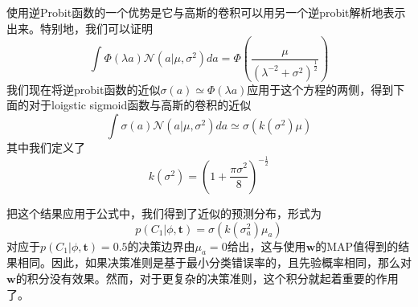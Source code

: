 使用逆Probit函数的一个优势是它与高斯的卷积可以用另一个逆probit解析地表示出来。特别地，我们可以证明 
\begin{equation}
	\int \Phi(\lambda a)\mathcal{N}(a|\mu,\sigma^2)da=\Phi\left(\frac{\mu}{(\lambda^{-2}+\sigma^2)^{\frac{1}{2}}} \right)
\end{equation}
我们现在将逆probit函数的近似$\sigma(a)\simeq \Phi(\lambda a)$应用于这个方程的两侧，得到下面的对于loigstic sigmoid函数与高斯的卷积的近似
\begin{equation}
	\int \sigma(a)\mathcal{N}(a|\mu,\sigma^2)da\simeq \sigma(k(\sigma^2)\mu)
\end{equation}
其中我们定义了
\begin{equation}
	k(\sigma^2)=(1+\frac{\pi\sigma^2}{8})^{-\frac{1}{2}}
\end{equation}

把这个结果应用于公式中，我们得到了近似的预测分布，形式为
\begin{equation}
\label{jiasup}
	p(C_1|\phi,\boldsymbol{t})=\sigma(k(\sigma_a^2)\mu_a)
\end{equation}
对应于$p(C_1|\phi,\boldsymbol{t})=0.5$的决策边界由$\mu_a=0$给出，这与使用$\boldsymbol{w}$的MAP值得到的结果相同。因此，如果决策准则是基于最小分类错误率的，且先验概率相同，那么对$\boldsymbol{w}$的积分没有效果。然而，对于更复杂的决策准则，这个积分就起着重要的作用了。